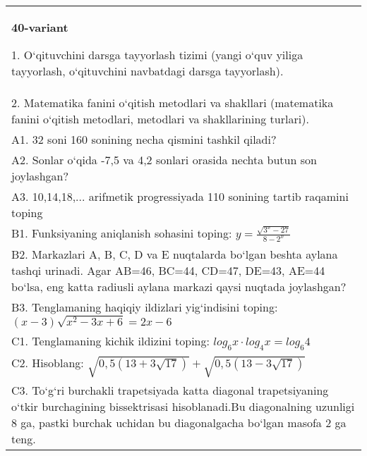 \documentclass{article}
\begin{document}
\begin{tabular}{m{17cm}}
\textbf{40-variant}

1. O‘qituvchini darsga tayyorlash tizimi (yangi o‘quv yiliga tayyorlash, o‘qituvchini navbatdagi darsga tayyorlash). \\
2. Matematika fanini o‘qitish metodlari va shakllari (matematika fanini o‘qitish metodlari, metodlari va shakllarining turlari). \\
A1. 32 soni 160 sonining necha qismini tashkil qiladi? \\
A2. Sonlar o‘qida -7,5 va 4,2 sonlari orasida nechta butun son joylashgan? \\
A3. 10,14,18,... arifmetik progressiyada 110 sonining tartib raqamini toping \\
B1. Funksiyaning aniqlanish sohasini toping: \(y = \frac{\sqrt{3^{x} - 27}}{8 - 2^{x}}\) \\
B2. Markazlari A, B, C, D va E nuqtalarda bo‘lgan beshta aylana tashqi urinadi. Agar AB=46, BC=44, CD=47, DE=43, AE=44 bo‘lsa, eng katta radiusli aylana markazi qaysi nuqtada joylashgan? \\
B3. Tenglamaning haqiqiy ildizlari yig‘indisini toping: \((x-3) \sqrt{x^{2} - 3x + 6} = 2x - 6\) \\
C1. Tenglamaning kichik ildizini toping: \(log_{6}x \cdot log_{4}x = log_{6}4\) \\
C2. Hisoblang: \(\sqrt{0,5 (13 + 3\sqrt{17}) } + \sqrt{0,5 (13 - 3\sqrt{17}) }\) \\
C3. To‘g‘ri burchakli trapetsiyada katta diagonal trapetsiyaning o‘tkir burchagining bissektrisasi hisoblanadi.Bu diagonalning uzunligi 8 ga, pastki burchak uchidan bu diagonalgacha bo‘lgan masofa 2 ga teng. \\

\end{tabular}
\vspace{1cm}
\end{document}
